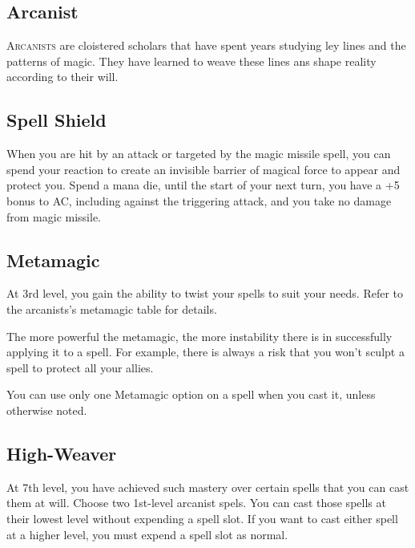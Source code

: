 
\begin{multicols*}{2}

\section{Arcanist}

\lettrine[lines=3, lhang=0.15, loversize=0.25, findent=.5em]{A}{rcanists} are cloistered scholars that have spent years studying ley lines and the patterns of magic. They have learned to weave these lines ans shape reality according to their will. 

\subsection*{Spell Shield}

When you are hit by an attack or targeted by the magic missile spell, you can spend your reaction to create an invisible barrier of magical force to appear and protect you. Spend a mana die, until the start of your next turn, you have a +5 bonus to AC, including against the triggering attack, and you take no damage from magic missile.


\subsection*{Metamagic}

At 3rd level, you gain the ability to twist your spells to suit your needs. Refer to the arcanists's metamagic table for details.

The more powerful the metamagic, the more instability there is in successfully applying it to a spell. For example, there is always a risk that you won't sculpt a spell to protect all your allies.

You can use only one Metamagic option on a spell when you cast it, unless otherwise noted.



\subsection*{High-Weaver}

At 7th level, you have achieved such mastery over certain spells that you can cast them at will. Choose two 1st-level arcanist spels. You can cast those spells at their lowest level without expending a spell slot. If you want to cast either spell at a higher level, you must expend a spell slot as normal.


\end{multicols*}
